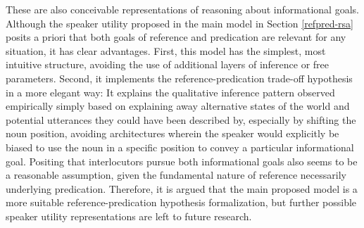These are also conceivable representations of reasoning about informational goals. Although the speaker utility proposed in the main model in Section \ref{refpred-rsa} posits a priori that both goals of reference and predication are relevant for any situation, it has clear advantages. First, this model has the simplest, most intuitive structure, avoiding the use of additional layers of inference or free parameters. Second, it implements the reference-predication trade-off hypothesis in a more elegant way: It explains the qualitative inference pattern observed empirically simply based on explaining away alternative states of the world and potential utterances they could have been described by, especially by shifting the noun position, avoiding architectures wherein the speaker would explicitly be biased to use the noun in a specific position to convey a particular informational goal. Positing that interlocutors pursue both informational goals also seems to be a reasonable assumption, given the fundamental nature of reference necessarily underlying predication. Therefore, it is argued that the main proposed model is a more suitable reference-predication hypothesis formalization, but further possible speaker utility representations are left to future research. 
